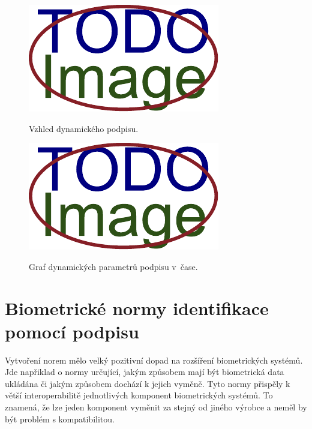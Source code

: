 \begin{figure}[h]
  \centering
  \begin{minipage}{0.45\textwidth}\label{fig:first-image}
      \centering
      \includegraphics[width=\textwidth]{obrazky-figures/placeholder.pdf}
      \caption{Vzhled dynamického podpisu.}
  \end{minipage}\hfill
  \begin{minipage}{0.45\textwidth}\label{fig:second-image}
      \centering
      \includegraphics[width=\textwidth]{obrazky-figures/placeholder.pdf}
      \caption{Graf dynamických parametrů podpisu v~čase.}
  \end{minipage}
\end{figure}

\section{Biometrické normy identifikace pomocí podpisu}

Vytvoření norem mělo velký pozitivní dopad na rozšíření biometrických systémů.                                                %
Jde napřiklad o normy určující, jakým způsobem mají být biometrická data ukládána či jakým způsobem dochází k jejich vyměně.  %
Tyto normy přispěly k větší interoperabilitě jednotlivých komponent biometrických systémů.                                    %
To znamená, že lze jeden komponent vyměnit za stejný od jiného výrobce a neměl by být problém s kompatibilitou.               %


